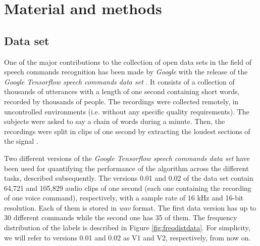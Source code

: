 \documentclass[review]{elsarticle}
\begin{document}
 \section{Material and methods} \label{sec:MM} 

\subsection{Data set}
One of the major contributions to the collection of open data sets in the field of speech commands recognition has been made by \textit{Google} with the release of the \textit{Google Tensorflow speech commands data set} \cite{speechcommands, Warden2018}. It consists of a collection of thousands of utterances with a length of one second containing short words, recorded by thousands of people. The recordings were collected remotely, in uncontrolled environments (i.e. without any specific quality requirements). The subjects were asked to say a chain of words during a minute. Then, the recordings were split in clips of one second by extracting the loudest sections of the signal \cite{speechcommands, Warden2018}.

Two different versions of the \textit{Google Tensorflow speech commands data set} have been used for quantifying the performance of the algorithm across the different tasks, described subsequently. The versions 0.01 and 0.02 of the data set contain 64,721 and 105,829 audio clips of one second (each one containing the recording of one voice command), respectively, with a sample rate of 16 kHz and 16-bit resolution. Each of them is stored in \textit{wav} format. The first data version has up to 30 different commands while the second one has 35 of them. The frequency distribution of the labels is described in Figure \ref{fig:freqdistdata}. For simplicity, we will refer to versions 0.01 and 0.02 as V1 and V2, respectively, from now on.
\end{document}
